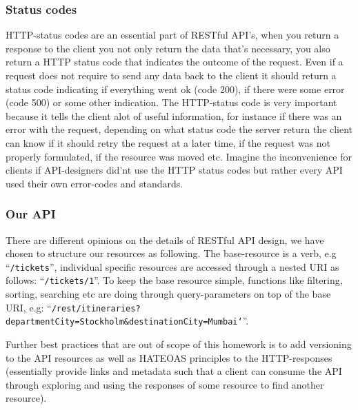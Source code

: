 \documentclass[a4paper, 11pt]{article}
\begin{document}
\subsubsection*{Status codes}
HTTP-status codes are an essential part of RESTful API's, when you return a response to the client you not only return the data that's necessary, you also return a HTTP status code that indicates the outcome of the request. Even if a request does not require to send any data back to the client it should return a status code indicating if everything went ok (code 200), if there were some error (code 500) or some other indication. The HTTP-status code is very important because it tells the client alot of useful information, for instance if there was an error with the request, depending on what status code the server return the client can know if it should retry the request at a later time, if the request was not properly formulated, if the resource was moved etc. Imagine the inconvenience for clients if API-designers did'nt use the HTTP status codes but rather every API used their own error-codes and standards.

\subsubsection*{Our API}
There are different opinions on the details of RESTful API design, we have chosen to structure our resources as following. The base-resource is a verb, e.g ``\texttt{/tickets}'', individual specific resources are accessed through a nested URI as follows: ``\texttt{/tickets/1}''. To keep the base resource simple, functions like filtering, sorting, searching etc are doing through query-parameters on top of the base URI, e.g: ``\texttt{/rest/itineraries?departmentCity=Stockholm\&destinationCity=Mumbai`}''.

Further best practices that are out of scope of this homework is to add versioning to the API resources as well as HATEOAS principles to the HTTP-responses (essentially provide links and metadata such that a client can consume the API through exploring and using the responses of some resource to find another resource).
\end{document}
